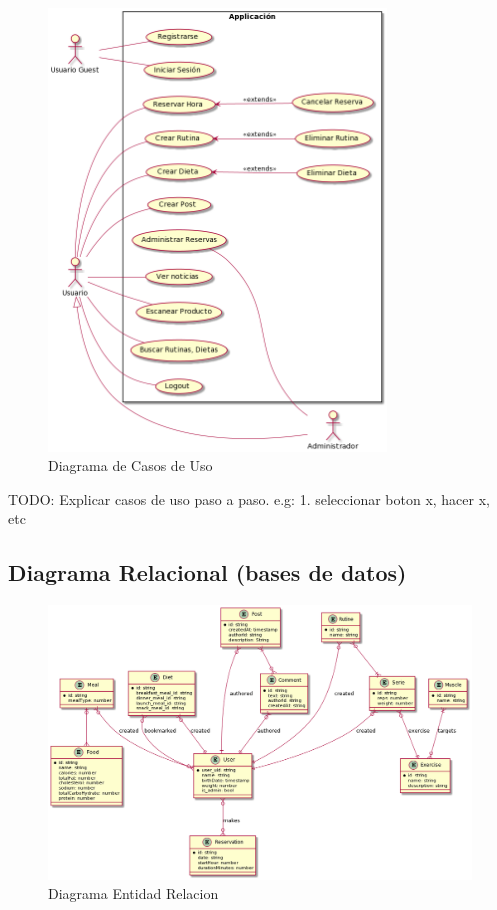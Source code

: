 \documentclass[12pt,a4paper]{article}
\begin{document}
\begin{figure}[h]
 	\centering
	\includegraphics[width=0.8\textwidth]{casos_uso}
	\caption{Diagrama de Casos de Uso}
\end{figure}

TODO: Explicar casos de uso paso a paso. e.g: 1. seleccionar boton x, hacer x, etc

\newpage

\subsection{Diagrama Relacional (bases de datos)}

\begin{figure}[h]
 	\centering
	\includegraphics[width=\textwidth]{diagramaer}
	\caption{Diagrama Entidad Relacion}
\end{figure}
\end{document}
